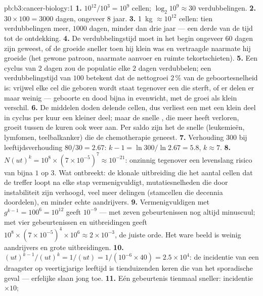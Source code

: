 \begin{solution}{pb:b3:cancer-biology:1}
\textbf{1.} $10^{12}/10^{3} = 10^{9}$ cellen; $\log_{2}10^{9} \approx 30$
verdubbelingen.
\textbf{2.} $30\times 100 = 3000$ dagen, ongeveer $8$ jaar.
\textbf{3.} \qty{1}{kg} $\approx 10^{12}$ cellen: tien verdubbelingen
meer, $1000$ dagen, minder dan drie jaar --- een derde van de tijd tot
de ontdekking.
\textbf{4.} De verdubbelingstijd moet in het begin ongeveer $60$ dagen
zijn geweest, of de  groeide sneller toen hij klein was en
vertraagde naarmate hij groeide (het gewone patroon, naarmate aanvoer
en ruimte tekortschieten).
\textbf{5.} Een cyclus van $2$ dagen zou de populatie elke $2$ dagen
verdubbelen; een verdubbelingstijd van $100$ betekent dat de
nettogroei $2\,\%$ van de geboortesnelheid is: vrijwel elke cel die
geboren wordt staat tegenover een die sterft, of er delen er maar
weinig --- geboorte en dood bijna in evenwicht, met de groei als klein
verschil.
\textbf{6.} De middelen doden delende cellen, dus verliest een  met
een klein deel in cyclus per kuur een kleiner deel; maar de snelle
, die meer heeft verloren, groeit tussen de kuren ook weer aan.
Per saldo zijn het de snelle  (leukemieën, lymfomen,
teelbalkanker) die de chemotherapie geneest.
\textbf{7.} Verhouding $300$ bij leeftijdsverhouding $80/30 = 2.67$: $k - 1 =
\ln 300/\ln 2.67 = 5.8$, $k \approx 7$.
\textbf{8.} $N(ut)^{k} = 10^{8}\times (7\times 10^{-5})^{7} \approx
10^{-21}$: onzinnig tegenover een levenslang risico van bijna $1$ op
$3$. Wat ontbreekt: de klonale uitbreiding die het aantal cellen dat de
treffer loopt na elke stap vermenigvuldigt, mutatiesnelheden die door
instabiliteit zijn verhoogd, veel meer delingen (stamcellen die
decennia doordelen), en minder echte aandrijvers.
\textbf{9.} Vermenigvuldigen met $g^{k-1} = 100^{6} = 10^{12}$ geeft
$10^{-9}$ --- met zeven gebeurtenissen nog altijd minuscuul; met vier
gebeurtenissen en uitbreidingen geeft
$10^{8}\times (7\times 10^{-5})^{4}\times 10^{6} \approx 2\times
10^{-3}$, de juiste orde. Het ware beeld is weinig aandrijvers en grote
uitbreidingen.
\textbf{10.} $(ut)^{k-1}/(ut)^{k} = 1/(ut) = 1/(10^{-6}\times 40) =
2.5\times 10^{4}$: de incidentie van een draagster op veertigjarige
leeftijd is tienduizenden keren die van het sporadische geval ---
erfelijke  slaan jong toe.
\textbf{11.} Eén gebeurtenis tienmaal sneller: incidentie $\times 10$;

\end{solution}

